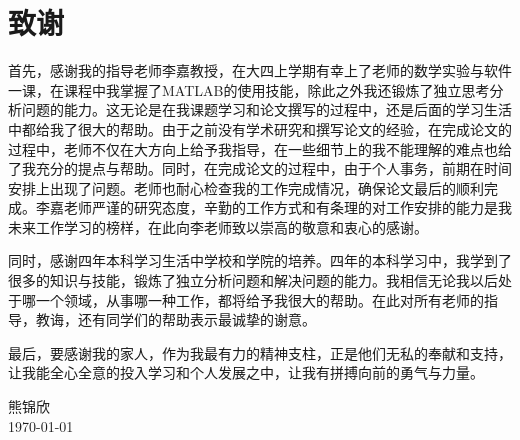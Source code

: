 
\chapter{致谢}
    首先，感谢我的指导老师李嘉教授，在大四上学期有幸上了老师的数学实验与软件一课，在课程中我掌握了MATLAB的使用技能，除此之外我还锻炼了独立思考分析问题的能力。这无论是在我课题学习和论文撰写的过程中，还是后面的学习生活中都给我了很大的帮助。由于之前没有学术研究和撰写论文的经验，在完成论文的过程中，老师不仅在大方向上给予我指导，在一些细节上的我不能理解的难点也给了我充分的提点与帮助。同时，在完成论文的过程中，由于个人事务，前期在时间安排上出现了问题。老师也耐心检查我的工作完成情况，确保论文最后的顺利完成。李嘉老师严谨的研究态度，辛勤的工作方式和有条理的对工作安排的能力是我未来工作学习的榜样，在此向李老师致以崇高的敬意和衷心的感谢。
    
    同时，感谢四年本科学习生活中学校和学院的培养。四年的本科学习中，我学到了很多的知识与技能，锻炼了独立分析问题和解决问题的能力。我相信无论我以后处于哪一个领域，从事哪一种工作，都将给予我很大的帮助。在此对所有老师的指导，教诲，还有同学们的帮助表示最诚挚的谢意。
    
	最后，要感谢我的家人，作为我最有力的精神支柱，正是他们无私的奉献和支持，让我能全心全意的投入学习和个人发展之中，让我有拼搏向前的勇气与力量。

\vskip 108pt
\begin{flushright}
	熊锦欣\makebox[1cm]{} \\
\today
\end{flushright}


